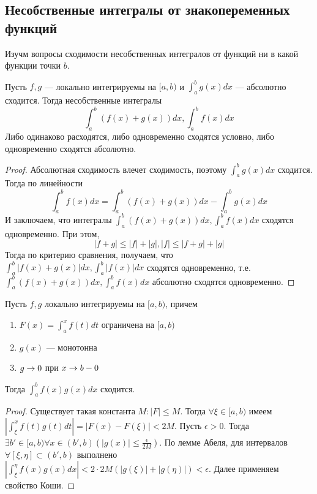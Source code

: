 
\subsection{Несобственные интегралы от знакопеременных функций}
Изучм вопросы сходимости несобственных интегралов от функций ни в какой функции точки \(b\).

\begin{lemma}
    Пусть \(f, g\) --- локально интегрируемы на \([a, b)\) и \(\int_a^b g(x)dx\) --- абсолютно сходится. Тогда несобственные интегралы 
    \[\int_a^b (f(x) + g(x))dx, \int_a^b f(x)dx\]
    Либо одинаково расходятся, либо одновременно сходятся условно, либо одновременно сходятся абсолютно.
\end{lemma}
\begin{proof}
    Абсолютная сходимость влечет сходимость, поэтому \(\int_a^bg(x)dx\) сходится. Тогда по линейности 
    \[\int_a^b f(x) dx = \int_a^b (f(x) + g(x)) dx - \int_a^b g(x) dx\]
    И заключаем, что интегралы \(\int_a^b (f(x) + g(x))dx, \int_a^b f(x)dx\) сходятся одновременно.
    При этом, 
    \[|f + g| \le |f| + |g|, |f| \le |f + g| + |g|\]
    Тогда по критерию сравнения, получаем, что \(\int_a^b |f(x) + g(x)|dx, \int_a^b |f(x)|dx\) сходятся одновременно, т.е. \(\int_a^b (f(x) + g(x))dx, \int_a^b f(x)dx\) абсолютно сходятся одновременно.
\end{proof}

\begin{theorem}
    Пусть \(f, g\) локально интегрируемы на \([a, b)\), причем
    \begin{enumerate}
        \item \(F(x) = \int_a^x f(t)dt\) ограничена на \([a, b)\)
        \item \(g(x)\) --- монотонна
        \item \(g \rightarrow 0\) при \(x \rightarrow b - 0\)
    \end{enumerate}
    Тогда \(\int_a^b f(x)g(x)dx\) сходится.
\end{theorem}
\begin{proof}
    Существует такая константа \(M: |F| \le M\). Тогда \(\forall \xi \in [a, b)\) имеем \(\left\lvert \int_\xi^x f(t)g(t)dt\right\rvert = |F(x) - F(\xi)| < 2M\). Пусть \(\epsilon > 0\). Тогда \(\exists b' \in [a, b) \forall x \in (b', b) \left(|g(x)| \le \frac{\epsilon}{2M}\right)\). По лемме Абеля, для интервалов \(\forall [\xi, \eta] \subset (b', b)\) выполнено \(\left\lvert \int_\xi^\eta f(x)g(x)dx\right\rvert < 2\cdot2M (|g(\xi)| + |g(\eta)|) < \epsilon\). Далее применяем свойство Коши.
\end{proof}

